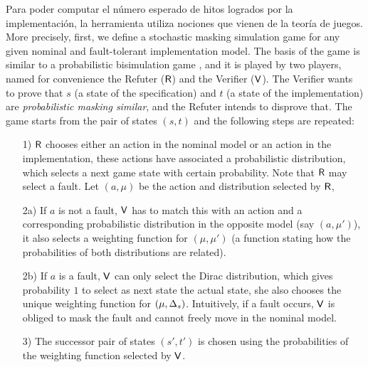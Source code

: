 \iffalse
Para poder computar el número esperado de hitos logrados por la implementación, la herramienta utiliza nociones que vienen de la teoría de juegos.
More precisely,  first, we define a stochastic masking simulation game for any given nominal and fault-tolerant implementation model.
The basis of the game is similar to a probabilistic bisimulation game \cite{Stirling98}, and it is played by two players, 
named for convenience the Refuter ($\mathsf{R}$) and the Verifier ($\mathsf{V}$). The Verifier 
wants to prove that $s$ (a state of the specification) and $t$ (a state of the implementation) are \emph{probabilistic masking similar}, 
and the Refuter intends to disprove that.
The game starts from the pair of states $(s, t)$ and the following steps are repeated:
\begin{enumerate}
\item[1)] $\mathsf{R}$ chooses either an action in the nominal model or an action in the implementation,  these actions have associated a probabilistic distribution,  which selects a next game state with certain probability.
Note that $\mathsf{R}$ may select a fault.   Let $(a,\mu)$ be the action and distribution selected by $\mathsf{R}$,
\item[2a)] If $a$ is not a fault,  $\mathsf{V}$ has to match this with an action and a corresponding probabilistic distribution in the opposite model (say $(a,\mu')$),
it also selects a weighting function \cite{JonssonLarsen91} for $(\mu, \mu')$ (a function stating how the probabilities of both distributions are related).
\item[2b)]
  If $a$ is a fault,  $\mathsf{V}$ can only select the Dirac
  distribution,  which gives probability $1$ to select as next state the actual state,   she also chooses the unique weighting function for
  $(\mu, \Delta_{s})$. Intuitively, if  a fault occurs,  $\mathsf{V}$ is obliged to mask the fault and cannot freely move in the nominal model.
\item[3)]
  The successor pair of states $(s',  t')$ is chosen  using the probabilities of the weighting function selected by $\mathsf{V}$.
\end{enumerate}
